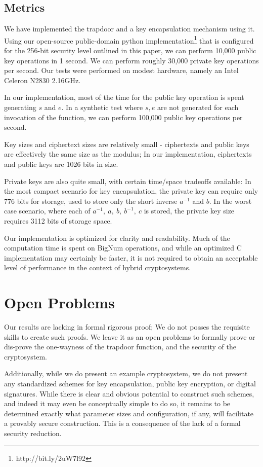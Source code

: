 \documentclass[preprint]{iacrtrans}
\begin{document}
\subsection{Metrics}
We have implemented the trapdoor and a key encapsulation mechanism using it. Using our open-source public-domain python implementation\footnote{http://bit.ly/2uW7l92} that is configured for the 256-bit security level outlined in this paper, we can perform 10,000 public key operations in 1 second. We can perform roughly 30,000 private key operations per second. Our tests were performed on modest hardware, namely an Intel Celeron N2830 2.16GHz. 

In our implementation, most of the time for the public key operation is spent generating $s$ and $e$. In a synthetic test where $s, e$ are not generated for each invocation of the function, we can perform 100,000 public key operations per second.

Key sizes and ciphertext sizes are relatively small - ciphertexts and public keys are effectively the same size as the modulus; In our implementation, ciphertexts and public keys are 1026 bits in size.

Private keys are also quite small, with certain time/space tradeoffs available: In the most compact scenario for key encapsulation, the private key can require only 776 bits for storage, used to store only the short inverse $a^{-1}$ and $b$. In the worst case scenario, where each of $a^{-1},\ a,\ b,\ b^{-1},\ c$ is stored, the private key size requires 3112 bits of storage space. 

Our implementation is optimized for clarity and readability. Much of the computation time is spent on BigNum operations, and while an optimized C implementation may certainly be faster, it is not required to obtain an acceptable level of performance in the context of hybrid cryptosystems. 

\section{Open Problems}
Our results are lacking in formal rigorous proof; We do not posses the requisite skills to create such proofs. We leave it as an open problems to formally prove or dis-prove the one-wayness of the trapdoor function, and the security of the cryptosystem.

Additionally, while we do present an example cryptosystem, we do not present any standardized schemes for key encapsulation, public key encryption, or digital signatures. While there is clear and obvious potential to construct such schemes, and indeed it may even be conceptually simple to do so, it remains to be determined exactly what parameter sizes and configuration, if any, will facilitate a provably secure construction. This is a consequence of the lack of a formal security reduction. 
\end{document}
